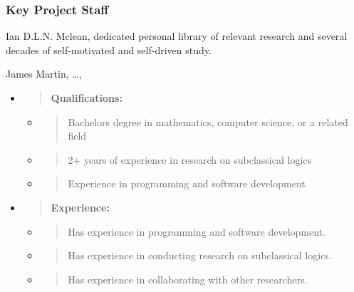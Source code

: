 \hypertarget{key-project-staff}{%
\subsubsection{Key Project Staff}\label{key-project-staff}}

Ian D.L.N. Mclean, dedicated personal library of relevant research and
several decades of self-motivated and self-driven study.

James Martin, \ldots,

\begin{itemize}
\item
  \begin{quote}
  \textbf{Qualifications:\\
  }
  \end{quote}

  \begin{itemize}
  \item
    \begin{quote}
    Bachelor\textquotesingle s degree in mathematics, computer science,
    or a related field
    \end{quote}
  \item
    \begin{quote}
    2+ years of experience in research on subclassical logics
    \end{quote}
  \item
    \begin{quote}
    Experience in programming and software development
    \end{quote}
  \end{itemize}
\item
  \begin{quote}
  \textbf{Experience:\\
  }
  \end{quote}

  \begin{itemize}
  \item
    \begin{quote}
    Has experience in programming and software development.
    \end{quote}
  \item
    \begin{quote}
    Has experience in conducting research on subclassical logics.
    \end{quote}
  \item
    \begin{quote}
    Has experience in collaborating with other researchers.
    \end{quote}
  \end{itemize}
\end{itemize}


